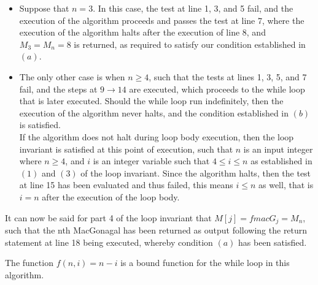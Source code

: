 \documentclass[12pt]{article}
\newenvironment{problem}[2][Problem]{\begin{trivlist}
\item[\hskip \labelsep {\bfseries #1}\hskip \labelsep {\bfseries #2.}]}{\end{trivlist}}
\begin{document}
\begin{problem}{8}
\begin{itemize}
\item Suppose that $n = 3$. In this case, the test at line 1, 3, and 5 fail, and the execution of the algorithm proceeds and passes the test at line 7, where the execution of the algorithm halts after the execution of line 8, and $M_3 = M_n = 8$ is returned, as required to satisfy our condition established in $(a)$.

\item The only other case is when $n \geq 4$, such that the tests at lines 1, 3, 5, and 7 fail, and the steps at $9 \rightarrow 14$ are executed, which proceeds to the while loop that is later executed. Should the while loop run indefinitely, then the execution of the algorithm never halts, and the condition established in $(b)$ is satisfied. \\

If the algorithm does not halt during loop body execution, then the loop invariant is satisfied at this point of execution, such that $n$ is an input integer where $n \geq 4$, and $i$ is an integer variable such that $4 \leq i \leq n$ as established in $(1)$ and $(3)$ of the loop invariant. Since the algorithm halts, then the test at line 15 has been evaluated and thus failed, this means $i \leq n$ as well, that is $i = n$ after the execution of the loop body.

\end{itemize}

\noindent
It can now be said for part 4 of the loop invariant that $M[j] = fmacG_j = M_n$, such that the nth MacGonagal has been returned as output following the return statement at line 18 being executed, whereby condition $(a)$ has been satisfied.

\end{problem}


\begin{problem}{9}
    The function $f\left(n,i\right) = n - i$ is a bound function for the while
    loop in this algorithm. 
\end{problem}
\end{document}
